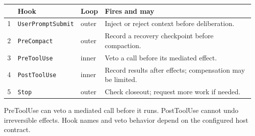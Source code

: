 \begin{minipage}{11.1cm}
\begin{tikzpicture}[pd figure,x=1cm,y=1cm]
\end{tikzpicture}
\par\smallskip
{\pdfiglabel\renewcommand{\arraystretch}{1.15}%
\begin{tabularx}{\linewidth}{@{}c p{2.8cm}p{1.05cm}>{\raggedright\arraybackslash}X@{}}
\toprule
 & \textbf{Hook} & \textbf{Loop} & \textbf{Fires and may}\\
\midrule
1 & \texttt{UserPromptSubmit} & outer & Inject or reject context before deliberation.\\
2 & \texttt{PreCompact} & outer & Record a recovery checkpoint before compaction.\\
3 & \texttt{PreToolUse} & inner & Veto a call before its mediated effect.\\
4 & \texttt{PostToolUse} & inner & Record results after effects; compensation may be limited.\\
5 & \texttt{Stop} & outer & Check closeout; request more work if needed.\\
\bottomrule
\end{tabularx}}
\par\smallskip
{\pdfiglabelitalic\raggedright PreToolUse can veto a mediated call before it runs.
PostToolUse cannot undo irreversible effects. Hook names and veto behavior
depend on the configured host contract.\par}
\end{minipage}
